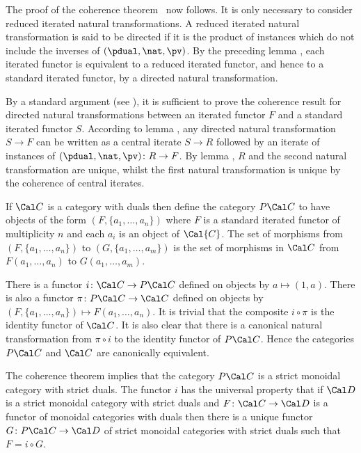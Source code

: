 The proof of the coherence theorem \coherence\ now follows. It is only 
necessary to consider reduced iterated natural transformations.  
A reduced iterated natural transformation is said to be directed if it is the 
product of instances which do not include the inverses of $(\pdual, \nat, 
\pv)$.  By the preceding lemma \reduced, each iterated functor is equivalent 
to a reduced iterated functor, and hence to a standard iterated functor, by a 
directed natural transformation.

By a standard argument (see \cite{MacLane  1963}),
it is sufficient to prove the coherence result for directed natural 
transformations between an iterated functor $F$ and a standard iterated 
functor $S$.
According to lemma \directed, any directed natural transformation $S\to F$ can 
be written as a central iterate $S\to R$ followed by an iterate of instances 
of $(\pdual, \nat, \pv)\colon R\to F$. By lemma \reduced, $R$ and the second 
natural transformation are unique, whilst the first natural transformation is 
unique by the coherence of central iterates.

 If $\Cal C$ is a category with duals
then define the category $P{\Cal C}$ to have objects of the form
$(F,\{a_1,\ldots ,a_n\})$ where $F$ is a standard iterated functor
 of multiplicity
$n$ and each $a_i$ is an object of $\Cal{C}$. The set of morphisms from
$(F,\{a_1,\ldots ,a_n\})$ to $(G,\{a_1,\ldots ,a_m\})$ is the set of
morphisms in $\Cal C$ from $F(a_1,\ldots ,a_n)$ to $G(a_1,\ldots ,a_m)$. 
\enddefinition

There is a functor $i\colon {\Cal C}\to P{\Cal C}$ defined on 
objects by $a\mapsto (1,a)$. There is also a functor 
$\pi\colon P{\Cal C}\to {\Cal C}$ defined on objects by
$(F,\{a_1,\ldots ,a_n\}) \mapsto F(a_1,\ldots ,a_n)$. It is trivial
that the composite $i\circ\pi$ is the identity functor of $\Cal C$.
It is also clear that there is a canonical natural transformation from
$\pi\circ i$ to the identity functor of $P{\Cal C}$. Hence the categories
$P{\Cal C}$ and ${\Cal C}$ are canonically equivalent.

The coherence theorem implies that the category $P{\Cal C}$ is a strict
monoidal category with strict duals. The functor $i$ has the universal
property that if $\Cal D$ is a strict monoidal category with strict duals and 
$F\colon{\Cal C}\to{\Cal D}$ is a functor of monoidal categories with duals
then there is a unique functor $G\colon P{\Cal C}\to{\Cal D}$ of strict
monoidal categories with strict duals such that $F=i\circ G$. 

